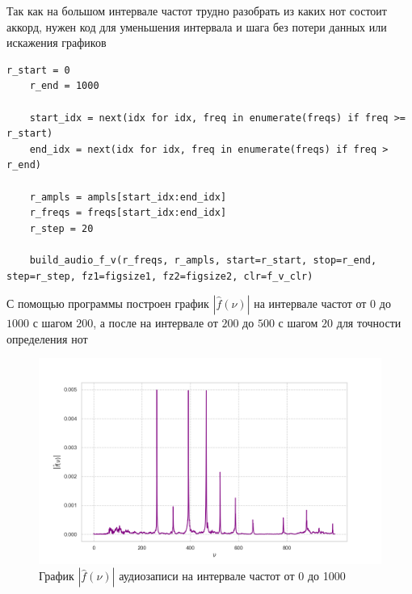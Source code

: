 \documentclass[a4paper, 16pt]{article}
\begin{document}
    \noindent Так как на большом интервале частот трудно разобрать из каких нот состоит аккорд,
    нужен код для уменьшения интервала и шага без потери данных или искажения графиков
    \begin{lstlisting}[label=f_v_1k, caption={Программа для изменения интервала частот и амплитуд}]
    r_start = 0
    r_end = 1000
        
    start_idx = next(idx for idx, freq in enumerate(freqs) if freq >= r_start)
    end_idx = next(idx for idx, freq in enumerate(freqs) if freq > r_end)
        
    r_ampls = ampls[start_idx:end_idx]
    r_freqs = freqs[start_idx:end_idx]
    r_step = 20

    build_audio_f_v(r_freqs, r_ampls, start=r_start, stop=r_end, step=r_step, fz1=figsize1, fz2=figsize2, clr=f_v_clr)
    \end{lstlisting}
    

    \noindent С помощью программы построен график $|\hat{f}(\nu)|$ на интервале частот от $0$ до $1000$
    с шагом $200$, а после на интервале от $200$ до $500$ с шагом $20$ для точности определения нот


    \begin{figure}[!htb]
        \centering
        \includegraphics[scale=0.5]{f_v_reduced_1k.png}
        \captionsetup{skip=0pt}
        \caption{График $|\hat{f}(\nu)|$ аудиозаписи на интервале частот от 0 до 1000}
        \label{Рис:17}
    \end{figure}
\end{document}
